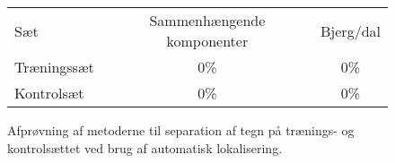 \begin{comment}
\begin{tabular}{|l|c|c|c|}\hline
\rowcolor[gray]{0.9} \multicolumn{4}{|>{\columncolor[gray]{0.9}}c|}{\textbf{Træningssæt}} \\ \hline
Billedstørrelse & Alle tegn & Bogstaver & Tal \\\hline
$5 \times 5$ & 0\% & 0\% & 0\% \\\hline
$10 \times 10$ & 0\% & 0\% & 0\%\\\hline
$20 \times 20$ & 0\% & 0\% & 0\%\\\hline \end{tabular}

\begin{tabular}{|l|c|c|c|}\hline
\rowcolor[gray]{0.9} \multicolumn{4}{|>{\columncolor[gray]{0.9}}c|}{\textbf{Kontrolsæt}} \\ \hline
Billedstørrelse & Alle tegn & Bogstaver & Tal \\\hline
$5 \times 5$ & 0\% & 0\% & 0\% \\\hline
$10 \times 10$ & 0\% & 0\% & 0\%\\\hline
$20 \times 20$ & 0\% & 0\% & 0\%\\\hline \end{tabular}
\end{comment}



\begin{figure}[htp]
\centering
\begin{tabular}{|l|c|c|}\hline
\rowcolor[gray]{0.9} \multicolumn{3}{|>{\columncolor[gray]{0.9}}c|}{\textbf{Automatisk lokalisering}} \\ \hline
Sæt & Sammenhængende komponenter & Bjerg/dal \\\hline
Træningssæt & 0\% & 0\% \\\hline
Kontrolsæt & 0\% & 0\% \\\hline
\end{tabular}
\caption{Afprøvning af metoderne til separation af tegn på trænings- og kontrolsættet ved brug af automatisk lokalisering.}
\label{fig:test:sep-auto}
\end{figure}

